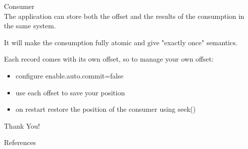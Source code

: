 \begin{frame}[plain,t]{Consumer} %
     \\
    \vspace{2ex}
    The application can store both the offset and the results of the consumption in the same system.
    
    \vspace{2ex}
    It will make the consumption fully atomic and give "exactly once" semantics.
    
    \vspace{2ex}
    Each record comes with its own offset, so to manage your own offset:
    \begin{itemize}
        \item configure enable.auto.commit=false
        \item use each offset to save your position
        \item on restart restore the position of the consumer using seek()
    \end{itemize}
    
    
\end{frame}





\begin{frame}[plain]
    \huge
    \vfill
    \centerline{  }
    \vfill
    
\end{frame}
\begin{frame}[plain]
    \huge
    \vfill
    \centerline{  }
    \vfill
    \Huge
    \centerline{\alert{Thank You!} }
    \vfill
\end{frame}

\begin{frame}{References}
\end{frame}  



